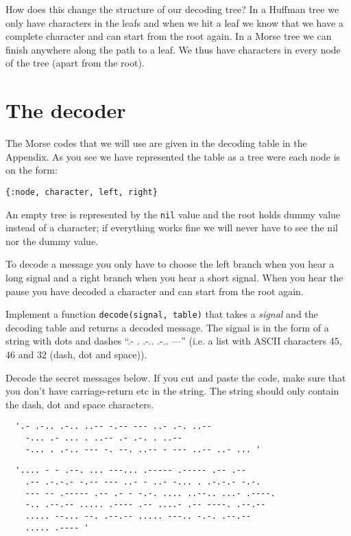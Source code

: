 \documentclass[a4paper,11pt]{article}
\begin{document}
How does this change the structure of our decoding tree? In a Huffman
tree we only have characters in the leafs and when we hit a leaf we
know that we have a complete character and can start from the root
again. In a Morse tree we can finish anywhere along the path to a
leaf. We thus have characters in every node of the tree (apart from the
root).



\section{The decoder}

The Morse codes that we will use are given in the decoding table in
the Appendix. As you see we have represented the table as a tree were
each node is on the form:

\begin{verbatim}
{:node, character, left, right}
\end{verbatim}

An empty tree is represented by the {\tt nil} value and the root holds
dummy value instead of a character; if everything works fine we
will never have to see the nil nor the dummy value.

To decode a message you only have to choose the left branch when you
hear a long signal and a right branch when you hear a short
signal. When you hear the pause you have decoded a character and can
start from the root again. 

Implement a function {\tt decode(signal, table)} that takes a {\em
  signal} and the decoding table and returns a decoded message. The
signal is in the form of a string with dots and dashes ``.-
. .-.. .-.. ---'' (i.e. a list with ASCII characters $45$, $46$ and
$32$ (dash, dot and space)).

Decode the secret messages below. If you cut and paste the code, make
sure that you don't have carriage-return etc in the string. The string
should only contain the dash, dot and space characters. 

\begin{verbatim}
  '.- .-.. .-.. ..-- -.-- --- ..- .-. ..-- 
    -... .- ... . ..-- .- .-. . ..-- 
    -... . .-.. --- -. --. ..-- - --- ..-- ..- ... '
\end{verbatim}

\begin{verbatim}
  '.... - - .--. ... ---... .----- .----- .-- .-- 
    .-- .-.-.- -.-- --- ..- - ..- -... . .-.-.- -.-. 
    --- -- .----- .-- .- - -.-. .... ..--.. ...- .----. 
    -.. .--.-- ..... .---- .-- ....- .-- ----. .--.-- 
    ..... --... --. .--.-- ..... ---.. -.-. .--.-- 
    ..... .---- '
\end{verbatim}
\end{document}
